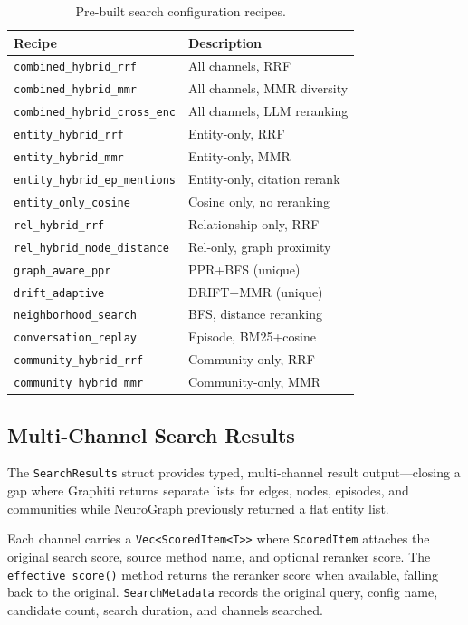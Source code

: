 \documentclass[11pt,a4paper,twocolumn]{article}
\begin{document}
\begin{table}[H]
\centering
\scriptsize
\caption{Pre-built search configuration recipes.}
\label{tab:recipes}
\begin{tabularx}{\columnwidth}{lX}
\toprule
\textbf{Recipe} & \textbf{Description} \\
\midrule
\texttt{combined\_hybrid\_rrf} & All channels, RRF \\
\texttt{combined\_hybrid\_mmr} & All channels, MMR diversity \\
\texttt{combined\_hybrid\_cross\_enc} & All channels, LLM reranking \\
\texttt{entity\_hybrid\_rrf} & Entity-only, RRF \\
\texttt{entity\_hybrid\_mmr} & Entity-only, MMR \\
\texttt{entity\_hybrid\_ep\_mentions} & Entity-only, citation rerank \\
\texttt{entity\_only\_cosine} & Cosine only, no reranking \\
\texttt{rel\_hybrid\_rrf} & Relationship-only, RRF \\
\texttt{rel\_hybrid\_node\_distance} & Rel-only, graph proximity \\
\texttt{graph\_aware\_ppr} & PPR+BFS (unique) \\
\texttt{drift\_adaptive} & DRIFT+MMR (unique) \\
\texttt{neighborhood\_search} & BFS, distance reranking \\
\texttt{conversation\_replay} & Episode, BM25+cosine \\
\texttt{community\_hybrid\_rrf} & Community-only, RRF \\
\texttt{community\_hybrid\_mmr} & Community-only, MMR \\
\bottomrule
\end{tabularx}
\end{table}

\subsection{Multi-Channel Search Results}
\label{sec:searchresults}

The \texttt{SearchResults} struct provides typed, multi-channel
result output---closing a gap where Graphiti returns separate
lists for edges, nodes, episodes, and communities while NeuroGraph
previously returned a flat entity list.

Each channel carries a \texttt{Vec<ScoredItem<T>>} where
\texttt{ScoredItem} attaches the original search score, source
method name, and optional reranker score. The
\texttt{effective\_score()} method returns the reranker score when
available, falling back to the original. \texttt{SearchMetadata}
records the original query, config name, candidate count, search
duration, and channels searched.
\end{document}
